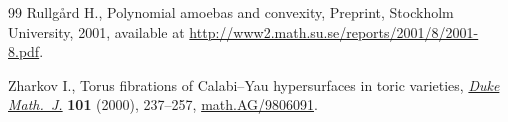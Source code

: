 \documentclass[10pt,a4paper]{amsart}
\numberwithin{equation}{section}
\begin{document}
\begin{thebibliography}{99}
Rullg{\aa}rd H., Polynomial amoebas and convexity, {P}reprint, Stockholm
 University, 2001, available at \url{http://www2.math.su.se/reports/2001/8/2001-8.pdf}.

Zharkov I., Torus f\/ibrations of {C}alabi--{Y}au hypersurfaces in toric
 varieties, \href{http://dx.doi.org/10.1215/S0012-7094-00-10124-X}{\textit{Duke Math.~J.}} \textbf{101} (2000), 237--257,
 \href{http://arxiv.org/abs/math.AG/9806091}{math.AG/9806091}.

\end{thebibliography}
\end{document}
